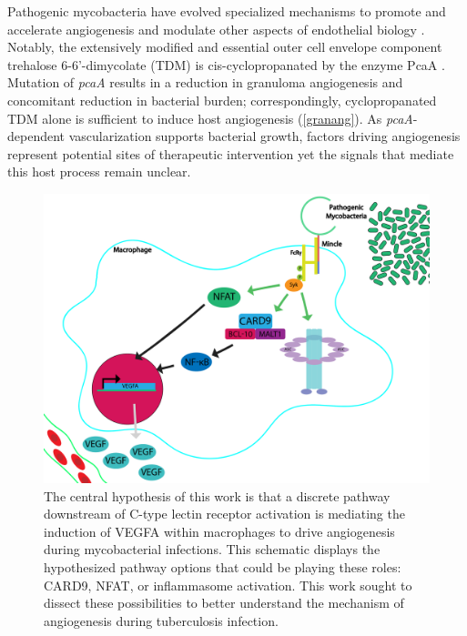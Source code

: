 Pathogenic mycobacteria have evolved specialized mechanisms to promote and accelerate angiogenesis and modulate other aspects of endothelial biology \citep{Oehlers2017}. Notably, the extensively modified and essential outer cell envelope component trehalose 6\hyp{}6'\hyp{}dimycolate (TDM) is cis\hyp{}cyclopropanated by the enzyme PcaA \citep{Glickman2000, Rao2005}. Mutation of \textit{pcaA} results in a reduction in granuloma angiogenesis and concomitant reduction in bacterial burden; correspondingly, cyclopropanated TDM alone is sufficient to induce host angiogenesis \citep{Saita2000, Sakaguchi2000, Walton2018} (\autoref{granang}). As \textit{pcaA}\hyp{}dependent vascularization supports bacterial growth, factors driving angiogenesis represent potential sites of therapeutic intervention yet the signals that mediate this host process remain unclear.

\begin{figure}
\centering
\includegraphics[width=\textwidth]{images/intro_schematic.pdf}
\caption[Schematic of the possible pathways downstream of C\hyp{}type lectin activation]{The central hypothesis of this work is that a discrete pathway downstream of C\hyp{}type lectin receptor activation is mediating the induction of VEGFA within macrophages to drive angiogenesis during mycobacterial infections. This schematic displays the hypothesized pathway options that could be playing these roles: CARD9, NFAT, or inflammasome activation. This work sought to dissect these possibilities to better understand the mechanism of angiogenesis during tuberculosis infection.}
\label{figure:beginschematic}
\end{figure}

